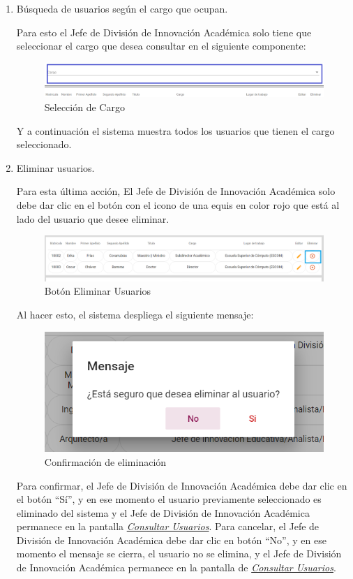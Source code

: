 \begin{enumerate}
	
	\item   Búsqueda de  usuarios según el cargo que ocupan.
	
	Para esto el Jefe de División de Innovación Académica  solo tiene que seleccionar el cargo que desea consultar en el siguiente componente:
	
	\begin{figure}[H]
		\centering
		\hypertarget{cargo1}{\includegraphics[width=0.7\linewidth]{images/SP5/BtnCargo1}}
		\caption{Selección de Cargo}
		\label{cargo1}
	\end{figure}
	
	Y a continuación el sistema muestra todos los usuarios que tienen el cargo seleccionado.
	
	\newpage
	
	\item Eliminar usuarios.
	
	Para esta última acción, El Jefe de División de Innovación Académica  solo debe dar clic en el botón con el icono de una equis en color rojo que está al lado del usuario que desee eliminar.
	
	\begin{figure}[H]
		\centering
		\hypertarget{eliminar}{\includegraphics[width=0.7\linewidth]{images/SP5/BtnEliminar}}
		\caption{Botón Eliminar Usuarios}
		\label{eliminar}
	\end{figure}
	
	Al hacer esto, el sistema despliega el siguiente mensaje:
	
	\begin{figure}[H]
		\centering
		\includegraphics[width=0.4\linewidth]{images/SP5/MSG22}
		\caption{Confirmación de eliminación}
		\label{confirmarE}
		
	\end{figure}
	
	Para confirmar, el Jefe de División de Innovación Académica  debe dar clic en el botón “Sí”, y en ese momento el usuario previamente seleccionado es eliminado del sistema y el Jefe de División de Innovación Académica  permanece en la pantalla \hyperlink{consultarUs}{\textit{Consultar Usuarios}}.
	Para cancelar, el Jefe de División de Innovación Académica  debe dar clic en botón “No”, y en ese momento el mensaje se cierra, el usuario no se elimina, y el Jefe de División de Innovación Académica  permanece en la pantalla de \hyperlink{consultarUs}{\textit{Consultar Usuarios}}.
	
\end{enumerate}


